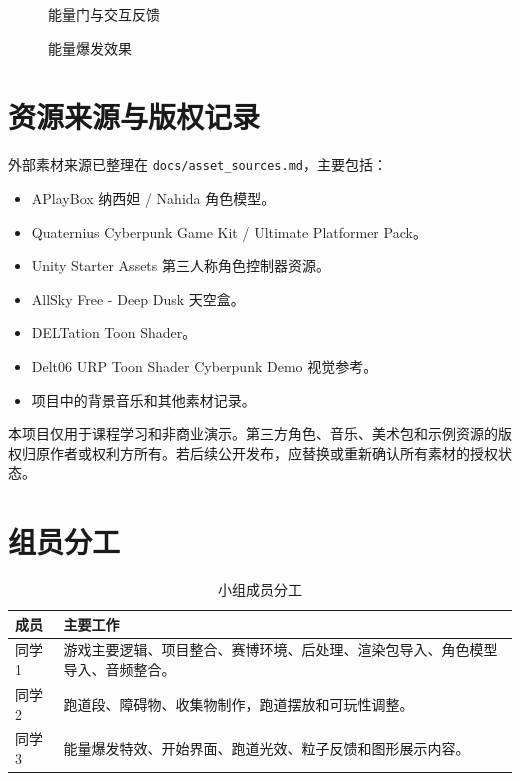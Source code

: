 \documentclass[UTF8,a4paper,12pt]{ctexart}
\begin{document}
\begin{figure}[H]
  \centering
  \caption{能量门与交互反馈}
\end{figure}

\begin{figure}[H]
  \centering
  \caption{能量爆发效果}
\end{figure}

\section{资源来源与版权记录}

外部素材来源已整理在 \texttt{docs/asset\_sources.md}，主要包括：

\begin{itemize}
  \item APlayBox 纳西妲 / Nahida 角色模型。
  \item Quaternius Cyberpunk Game Kit / Ultimate Platformer Pack。
  \item Unity Starter Assets 第三人称角色控制器资源。
  \item AllSky Free - Deep Dusk 天空盒。
  \item DELTation Toon Shader。
  \item Delt06 URP Toon Shader Cyberpunk Demo 视觉参考。
  \item 项目中的背景音乐和其他素材记录。
\end{itemize}

本项目仅用于课程学习和非商业演示。第三方角色、音乐、美术包和示例资源的版权归原作者或权利方所有。若后续公开发布，应替换或重新确认所有素材的授权状态。

\section{组员分工}

\begin{table}[H]
\centering
\begin{tabular}{p{3cm}p{10cm}}
\toprule
成员 & 主要工作 \\
\midrule
同学 1 & 游戏主要逻辑、项目整合、赛博环境、后处理、渲染包导入、角色模型导入、音频整合。 \\
同学 2 & 跑道段、障碍物、收集物制作，跑道摆放和可玩性调整。 \\
同学 3 & 能量爆发特效、开始界面、跑道光效、粒子反馈和图形展示内容。 \\
\bottomrule
\end{tabular}
\caption{小组成员分工}
\end{table}
\end{document}
